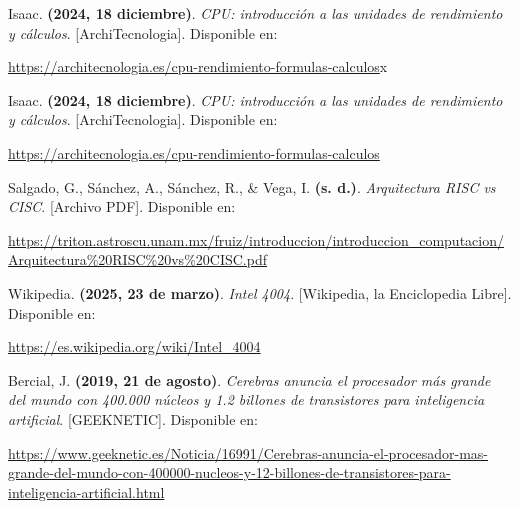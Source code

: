 \documentclass[12pt,letterpaper]{article}
\begin{document}
\begin{thebibliography}{9}
  Isaac. \textbf{(2024, 18 diciembre)}. \textit{CPU: introducción a las unidades de rendimiento y cálculos}. [ArchiTecnologia]. Disponible en:

  \url{https://architecnologia.es/cpu-rendimiento-formulas-calculos}x
  
  Isaac. \textbf{(2024, 18 diciembre)}. \textit{CPU: introducción a las unidades de rendimiento y cálculos}. [ArchiTecnologia]. Disponible en:
  
  \url{https://architecnologia.es/cpu-rendimiento-formulas-calculos}

  Salgado, G., Sánchez, A., Sánchez, R., \& Vega, I. \textbf{(s. d.)}. \textit{Arquitectura RISC vs CISC}. [Archivo PDF]. Disponible en:

  \url{https://triton.astroscu.unam.mx/fruiz/introduccion/introduccion_computacion/Arquitectura\%20RISC\%20vs\%20CISC.pdf}

  Wikipedia. \textbf{(2025, 23 de marzo)}. \textit{Intel 4004}. [Wikipedia, la Enciclopedia Libre]. Disponible en:

  \url{https://es.wikipedia.org/wiki/Intel_4004}

  Bercial, J. \textbf{(2019, 21 de agosto)}. \textit{Cerebras anuncia el procesador más grande del mundo con 400.000 núcleos y 1.2 billones de transistores para inteligencia artificial}. [GEEKNETIC]. Disponible en:

  \url{https://www.geeknetic.es/Noticia/16991/Cerebras-anuncia-el-procesador-mas-grande-del-mundo-con-400000-nucleos-y-12-billones-de-transistores-para-inteligencia-artificial.html}

\end{thebibliography}
\end{document}
